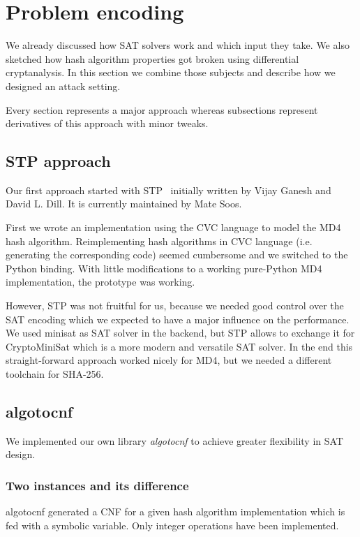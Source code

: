 \renewcommand*\chappic{img/encoding.pdf}
\renewcommand*\chapquote{There is concensus that encoding techniques usually have a dramatic impact on the efficiency of the SAT solver}
\renewcommand*\chapquotesrc{Magnus Bj\"ork}
\chapter{Problem encoding}
\label{ch:enc}

We already discussed how SAT solvers work and which input they take.
We also sketched how hash algorithm properties got broken using
differential cryptanalysis. In this section we combine those
subjects and describe how we designed an attack setting.

Every section represents a major approach whereas subsections
represent derivatives of this approach with minor tweaks.

\section{STP approach}
\label{sec:enc-stp}
%
Our first approach started with STP~\cite{stp} initially written by Vijay Ganesh and David L. Dill.
It is currently maintained by Mate Soos.

First we wrote an implementation using the CVC language to model the MD4 hash algorithm.
Reimplementing hash algorithms in CVC language (i.e. generating the corresponding code)
seemed cumbersome and we switched to the Python binding. With little modifications to
a working pure-Python MD4 implementation, the prototype was working.

However, STP was not fruitful for us, because we needed good control over the SAT encoding
which we expected to have a major influence on the performance. We used minisat as SAT solver
in the backend, but STP allows to exchange it for CryptoMiniSat which is a more modern and
versatile SAT solver. In the end this straight-forward approach worked nicely for MD4,
but we needed a different toolchain for SHA-256.

\section{algotocnf}
\label{sec:enc-algotocnf}
%
We implemented our own library \emph{algotocnf} to achieve greater flexibility in SAT design.

\subsection{Two instances and its difference}
\label{sec:enc-original}
%
algotocnf generated a CNF for a given hash algorithm implementation which is fed with
a symbolic variable. Only integer operations have been implemented.

